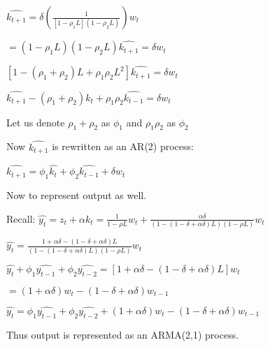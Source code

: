 \documentclass[11pt, oneside]{article}   	%
\begin{document}
$\widehat{k_{t+1}} = \delta(\frac{1}{[1-\rho_1 L] (1-\rho_2 L)})w_t$

$=(1-\rho_1 L)(1-\rho_2 L)\widehat{k_{t+1}} = \delta w_t$

$[1-(\rho_1 + \rho_2)L + \rho_1 \rho_2 L^2]\widehat{k_{t+1}} = \delta w_t$

$\widehat{k_{t+1}} - (\rho_1 + \rho_2)\hat{k_t} + \rho_1 \rho_2 \widehat{k_{t-1}} = \delta w_t$

Let us denote $\rho_1 + \rho_2$ as $\phi_1$ and $\rho_1 \rho_2$ as $\phi_2$

Now $\widehat{k_{t+1}}$ is rewritten as an AR(2) process:

$\widehat{k_{t+1}} = \phi_1 \hat{k_t} + \phi_2 \widehat{k_{t-1}} + \delta w_t$

Now to represent output as well.

Recall: $\hat{y_t} = z_t + \alpha k_t = \frac{1}{1-\rho L}w_t + \frac{\alpha \delta}{(1-(1-\delta+\alpha \delta)L)(1-\rho L)}w_t$

$\hat{y_t}=\frac{1+\alpha \delta - (1-\delta+\alpha \delta)L}{(1-(1-\delta +\alpha \delta)L)(1-\rho L)}w_t$

$\hat{y_t} + \phi_1 \widehat{y_{t-1}} + \phi_2 \widehat{y_{t-2}} = [1+\alpha \delta - (1-\delta + \alpha \delta)L]w_t$

$=(1+\alpha \delta)w_t - (1-\delta + \alpha \delta)w_{t-1}$

$\hat{y_t} = \phi_1 \widehat{y_{t-1}} + \phi_2 \widehat{y_{t-2}} + (1+\alpha \delta)w_t - (1-\delta + \alpha \delta)w_{t-1}$

Thus output is represented as an ARMA(2,1) process.
\end{document}
